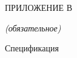 \lstset{style=pythoninlinestyle}


 \begin{center}
	ПРИЛОЖЕНИЕ В
	
	\textit{(обязательное)}
\end{center}


\begin{center}
	Спецификация
\end{center}

